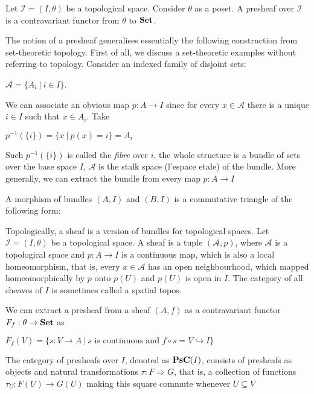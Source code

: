 \documentclass[a4paper]{article}
\theoremstyle{defin}
\theoremstyle{theorem}
\theoremstyle{claim}
\theoremstyle{prop}
\theoremstyle{lemma}
\theoremstyle{fact}
\theoremstyle{ex}
\theoremstyle{col}
\begin{document}
Let $\mathcal{I} = (I, \theta)$ be a topological space. Consider $\theta$ as a poset. A {\emph presheaf} over $\mathcal{I}$ is a contravariant functor from $\theta$ to ${\bf Set}$.

The notion of a presheaf generalises essentially the following construction from set-theoretic topology. First of all, we discuss a set-theoretic examples without referring to topology. Consider an indexed family of disjoint sets:
\begin{center}
$\mathcal{A} = \{ A_i \: | \: i \in I \}$.
\end{center}
We can associate an obvious map $p : A \to I$ since for every $x \in \mathcal{A}$ there is a unique $i \in I$ such that $x \in A_i$. Take

\begin{center}
$p^{-1}(\{ i \}) = \{ x \: | \: p(x) = i\} = A_i$
\end{center}

Such $p^{-1}(\{ i \})$ is called the \emph{fibre} over $i$, the whole structure is a bundle of sets over the base space $I$, $\mathcal{A}$ is the stalk space (l'espace etale) of the bundle. More generally, we can extract the bundle from every map $p : A \to I$

A morphism of bundles $(A, I)$ and $(B, I)$ is a commutative triangle of the following form:


Topologically, a sheaf is a version of bundles for topological spaces. Let $\mathcal{I} = (I, \theta)$ be a topological space. A sheaf is a tuple $(\mathcal{A}, p)$, where $\mathcal{A}$ is a topological space and $p : A \to I$ is a continuous map, which is also a local homeomorphism, that is, every $x \in \mathcal{A}$ has an open neighbourhood, which mapped homeomorphically by $p$ onto $p(U)$ and $p(U)$ is open in $I$. The category of all sheaves of $I$ is sometimes called a spatial topos.

We can extract a presheaf from a sheaf $(A, f)$ as a contravariant functor $F_f : \theta \to {\bf Set}$ as
\begin{center}
$F_f(V) = \{ s : V \to A \: | \: \text{$s$ is continuous and $f \circ s = V \hookrightarrow I $}\}$
\end{center}

The category of presheafs over $I$, denoted as ${\bf PsC}(I)$, consists of presheafs as objects and natural transformations $\tau : F \Rightarrow G$, that is, a collection of functions $\tau_U : F(U) \to G(U)$ making this square commute whenever $U \subseteq V$
\end{document}
